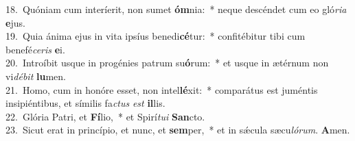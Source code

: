 {18.~}Quóniam cum interíerit, non sumet \textbf{óm}nia:~* neque descéndet cum eo gló\textit{ri}\textit{a} \textbf{e}jus.\\
{19.~}Quia ánima ejus in vita ipsíus benedi\textbf{cé}tur:~* confitébitur tibi cum benefé\textit{ce}\textit{ris} \textbf{e}i.\\
{20.~}Introíbit usque in progénies patrum su\textbf{ó}rum:~* et usque in ætérnum non vi\textit{dé}\textit{bit} \textbf{lu}men.\\
{21.~}Homo, cum in honóre esset, non intel\textbf{lé}xit:~* comparátus est juméntis insipiéntibus, et símilis fa\textit{ctus} \textit{est} \textbf{il}lis.\\
{22.~}Glória Patri, et \textbf{Fí}lio,~* et Spirí\textit{tu}\textit{i} \textbf{San}cto.\\
{23.~}Sicut erat in princípio, et nunc, et \textbf{sem}per,~* et in sǽcula sæcu\textit{ló}\textit{rum}. \textbf{A}men.\\
